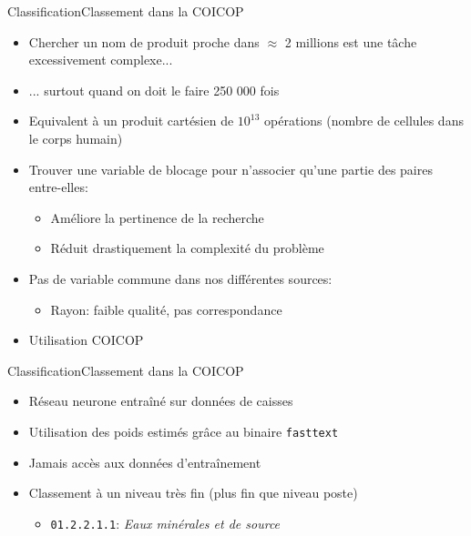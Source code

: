 \documentclass[ignorenonframetext,]{beamer}
\begin{document}
\begin{frame}{Classification}{Classement dans la COICOP}

\begin{itemize}
    \item Chercher un nom de produit proche dans $\approx$ 2 millions est une tâche excessivement complexe...
    \item ... surtout quand on doit le faire 250 000 fois
    \item Equivalent à un produit cartésien de $10^{13}$ opérations (nombre de cellules dans le corps humain)
    \item Trouver une variable de blocage pour n'associer qu'une partie des paires entre-elles:
    \begin{itemize}
        \item Améliore la pertinence de la recherche
        \item Réduit drastiquement la complexité du problème
    \end{itemize}
    \item Pas de variable commune dans nos différentes sources:
    \begin{itemize}
        \item Rayon: faible qualité, pas correspondance 
    \end{itemize}
    \item Utilisation COICOP
\end{itemize}
    
\end{frame}

\begin{frame}{Classification}{Classement dans la COICOP}

\begin{itemize}
    \item Réseau neurone entraîné sur données de caisses
    \item Utilisation des poids estimés grâce au binaire \texttt{fasttext}
    \item Jamais accès aux données d'entraînement
    \item Classement à un niveau très fin (plus fin que niveau poste)
    \begin{itemize}
        \item \texttt{01.2.2.1.1}: \textit{Eaux minérales et de source}
    \end{itemize}
\end{itemize}

\begin{center}
\end{center}
    
\end{frame}
\end{document}
